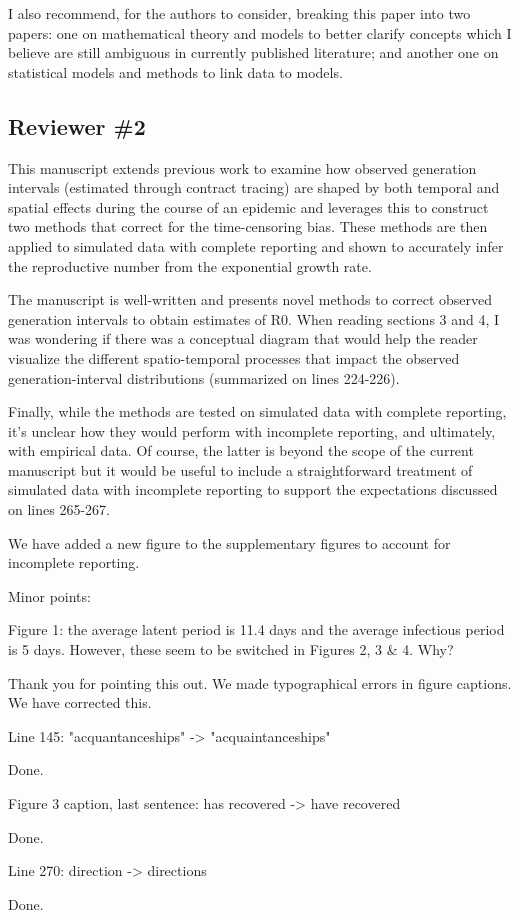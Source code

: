 \documentclass[12pt]{article}
\newcommand{\reviewer}{\subsection*}
\newcommand{\revtext}{\textsf}
\begin{document}
\revtext{
I also recommend, for the authors to consider, breaking this paper
into two papers: one on mathematical theory and models to better
clarify concepts which I believe are still ambiguous in currently published literature; and another one on statistical models and methods
to link data to models.
}

\reviewer{Reviewer \#2}

\revtext{
This manuscript extends previous work to examine how observed generation intervals (estimated through contract tracing) are shaped by both temporal and spatial effects during the course of an epidemic and leverages this to construct two methods that correct for the time-censoring bias. These methods are then applied to simulated data with complete reporting and shown to accurately infer the reproductive number from the exponential growth rate.
}

\revtext{
The manuscript is well-written and presents novel methods to correct observed generation intervals to obtain estimates of R0. When reading sections 3 and 4, I was wondering if there was a conceptual diagram that would help the reader visualize the different spatio-temporal processes that impact the observed generation-interval distributions (summarized on lines 224-226).}

\revtext{Finally, while the methods are tested on simulated data with complete reporting, it's unclear how they would perform with incomplete reporting, and ultimately, with empirical data. Of course, the latter is beyond the scope of the current manuscript but it would be useful to include a straightforward treatment of simulated data with incomplete reporting to support the expectations discussed on lines 265-267.}

We have added a new figure to the supplementary figures to account for incomplete reporting.

\revtext{Minor points:}

\revtext{Figure 1: the average latent period is 11.4 days and the average infectious period is 5 days. However, these seem to be switched in Figures 2, 3 & 4. Why?}

Thank you for pointing this out. We made typographical errors in figure captions. We have corrected this.

\revtext{Line 145: "acquantanceships" -> "acquaintanceships"}

Done.

\revtext{Figure 3 caption, last sentence: has recovered -> have recovered}

Done.

\revtext{Line 270: direction -> directions }

Done.


\end{document}

